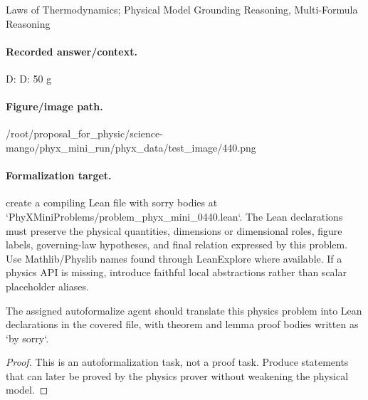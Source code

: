 Laws of Thermodynamics; Physical Model Grounding Reasoning, Multi-Formula Reasoning

\paragraph{Recorded answer/context.}
D: D: 50 g

\paragraph{Figure/image path.}
/root/proposal\_for\_physic/science-mango/phyx\_mini\_run/phyx\_data/test\_image/440.png

\paragraph{Formalization target.}
create a compiling Lean file with sorry bodies at `PhyXMiniProblems/problem\_phyx\_mini\_0440.lean`. The Lean declarations must preserve the physical quantities, dimensions or dimensional roles, figure labels, governing-law hypotheses, and final relation expressed by this problem.
Use Mathlib/Physlib names found through LeanExplore where available. If a physics API is missing, introduce faithful local abstractions rather than scalar placeholder aliases.

\begin{theorem}
\label{thm:physics:phyx_mini_0440:target}
The assigned autoformalize agent should translate this physics problem into Lean declarations in the covered file, with theorem and lemma proof bodies written as `by sorry`.
\end{theorem}
\begin{proof}
This is an autoformalization task, not a proof task. Produce statements that can later be proved by the physics prover without weakening the physical model.
\end{proof}

